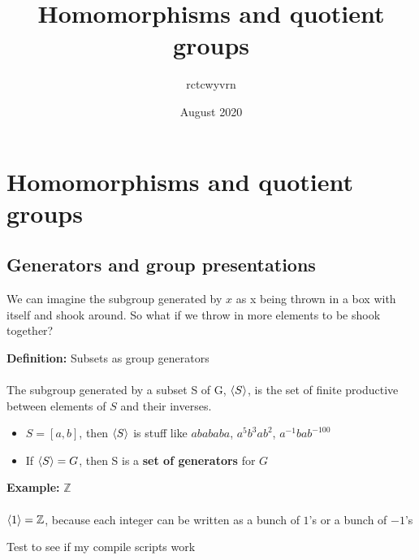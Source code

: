 \documentclass{article}
\title{Homomorphisms and quotient groups}
\author{rctcwyvrn }
\date{August 2020}
\newcommand{\Z}{\mathbb{Z}}
\begin{document}
\maketitle


\section{Homomorphisms and quotient groups}
\subsection{Generators and group presentations}
We can imagine the subgroup generated by $x$ as x being thrown in a box with itself and shook around. So what if we throw in more elements to be shook together? 
\begin{definition} 
\textbf{Definition:} Subsets as group generators \\
~\\
The subgroup generated by a subset S of G, $\braket{S}$, is the set of finite productive between elements of $S$ and their inverses. 
\begin{itemize}
	\item $S = [a,b]$, then $\braket{S}$ is stuff like $abababa$, $a^5b^3ab^2$, $a^{-1}bab^{-100}$
	\item If $\braket{S}=G$, then S is a {\color{blue} \textbf{set of generators}} for $G$
\end{itemize}
\end{definition}
\begin{example} 
\textbf{Example:} $\Z$ \\
~\\
$\braket{1} = \Z$, because each integer can be written as a bunch of $1$'s or a bunch of $-1$'s
\end{example}
Test to see if my compile scripts work
\end{document}

